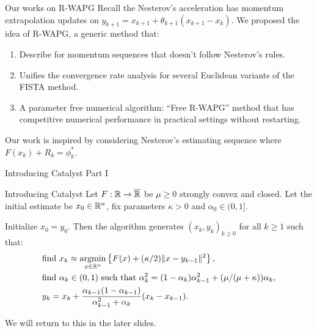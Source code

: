 \documentclass[11pt]{beamer}
\theoremstyle{definition}
\begin{document}
        \begin{frame}{Our works on R-WAPG}
            Recall the Nesterov's acceleration has momentum extrapolation updates on $y_{k + 1} = x_{k + 1} + \theta_{k + 1}(x_{k + 1} - x_k)$. 
            We proposed the idea of R-WAPG, a generic method that: 
            \begin{enumerate}
                \item Describe for momentum sequences that doesn't follow Nesterov's rules.
                \item Unifies the convergence rate analysis for several Euclidean variants of the FISTA method. 
                \item A parameter free numerical algorithm: ``Free R-WAPG'' method that has competitive numerical performance in practical settings without restarting. 
            \end{enumerate}
            Our work is inspired by considering Nesterov's estimating sequence where $F(x_k) + R_k = \phi_k^*$. 
        \end{frame}
        \begin{frame}{Introducing Catalyst Part I}
            \begin{block}{Introducing Catalyst}
                Let $F:\mathbb R \rightarrow \overline {\mathbb R}$ be $\mu \ge 0$ strongly convex and closed. 
                Let the initial estimate be $x_0 \in \mathbb R^n$, fix parameters $\kappa > 0$ and $\alpha_0 \in (0, 1]$. 
                {\small 
                \begin{tcolorbox}
                    Initialize $x_0 = y_0$. Then the algorithm generates $(x_k, y_k)_{k\ge 0}$ for all $k \ge 1$ such that: 
                    \begin{align*}
                        & \text{find } x_k \approx \mathop{\rm argmin}\limits_{x \in \mathbb R^n} \left\lbrace F(x) + (\kappa/2)\Vert x - y_{k - 1}\Vert^2\right\rbrace, 
                        \\
                        & \text{find } \alpha_k \in (0, 1) \text{ such that } \alpha_k^2 = (1 - \alpha_k)\alpha_{k - 1}^2 + (\mu/(\mu + \kappa))\alpha_k,
                        \\
                        & 
                        y_{k} = x_k + \frac{\alpha_{k - 1}(1 - \alpha_{k - 1})}{\alpha_{k - 1}^2 + \alpha_k}(x_k - x_{k - 1}). 
                    \end{align*}
                \end{tcolorbox}
                }
            \end{block}
            We will return to this in the later slides. 
        \end{frame}
\end{document}
